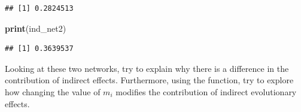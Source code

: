 \documentclass[
]{book}
\newenvironment{Shaded}{\begin{snugshade}}{\end{snugshade}}
\newcommand{\FunctionTok}[1]{\textcolor[rgb]{0.13,0.29,0.53}{\textbf{#1}}}
\newcommand{\NormalTok}[1]{#1}
\begin{document}
\begin{verbatim}
## [1] 0.2824513
\end{verbatim}

\begin{Shaded}
\begin{Highlighting}[]
\FunctionTok{print}\NormalTok{(ind\_net2)}
\end{Highlighting}
\end{Shaded}

\begin{verbatim}
## [1] 0.3639537
\end{verbatim}

Looking at these two networks, try to explain why there is a difference in the contribution of indirect effects. Furthermore, using the function, try to explore how changing the value of \(m_{i}\) modifies the contribution of indirect evolutionary effects.

  
\end{document}
